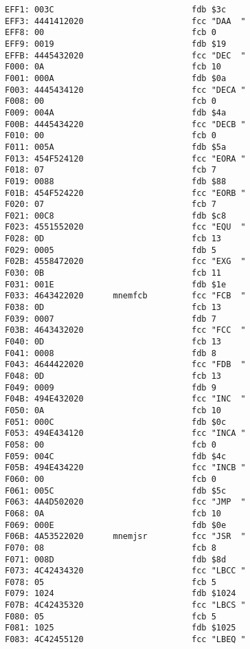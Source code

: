 {\begin{verbatim}
EFF1: 003C                            fdb $3c
EFF3: 4441412020                      fcc "DAA  "
EFF8: 00                              fcb 0
EFF9: 0019                            fdb $19
EFFB: 4445432020                      fcc "DEC  "
F000: 0A                              fcb 10
F001: 000A                            fdb $0a
F003: 4445434120                      fcc "DECA "
F008: 00                              fcb 0
F009: 004A                            fdb $4a
F00B: 4445434220                      fcc "DECB "
F010: 00                              fcb 0
F011: 005A                            fdb $5a
F013: 454F524120                      fcc "EORA "
F018: 07                              fcb 7
F019: 0088                            fdb $88
F01B: 454F524220                      fcc "EORB "
F020: 07                              fcb 7
F021: 00C8                            fdb $c8
F023: 4551552020                      fcc "EQU  "
F028: 0D                              fcb 13
F029: 0005                            fdb 5
F02B: 4558472020                      fcc "EXG  "
F030: 0B                              fcb 11
F031: 001E                            fdb $1e
F033: 4643422020      mnemfcb         fcc "FCB  "
F038: 0D                              fcb 13
F039: 0007                            fdb 7
F03B: 4643432020                      fcc "FCC  "
F040: 0D                              fcb 13
F041: 0008                            fdb 8
F043: 4644422020                      fcc "FDB  "
F048: 0D                              fcb 13
F049: 0009                            fdb 9
F04B: 494E432020                      fcc "INC  "
F050: 0A                              fcb 10
F051: 000C                            fdb $0c
F053: 494E434120                      fcc "INCA "
F058: 00                              fcb 0
F059: 004C                            fdb $4c
F05B: 494E434220                      fcc "INCB "
F060: 00                              fcb 0
F061: 005C                            fdb $5c
F063: 4A4D502020                      fcc "JMP  "
F068: 0A                              fcb 10
F069: 000E                            fdb $0e
F06B: 4A53522020      mnemjsr         fcc "JSR  "
F070: 08                              fcb 8
F071: 008D                            fdb $8d
F073: 4C42434320                      fcc "LBCC "
F078: 05                              fcb 5
F079: 1024                            fdb $1024
F07B: 4C42435320                      fcc "LBCS "
F080: 05                              fcb 5
F081: 1025                            fdb $1025
F083: 4C42455120                      fcc "LBEQ "

\end{verbatim}}
